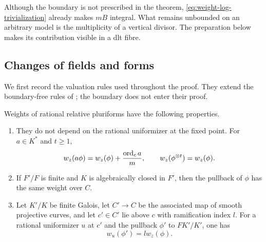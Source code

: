 Although the boundary is not prescribed in the theorem,
\eqref{eq:weight-log-trivialization} already makes $mB$ integral.
What remains unbounded on an arbitrary model is the multiplicity of a
vertical divisor.  The preparation below makes its contribution visible
in a dlt fibre.

\subsection{Changes of fields and forms}

We first record the valuation rules used throughout the proof.  They
extend the boundary-free rules of \cite[Lemma~4.2]{U}; the boundary does
not enter their proof.

\begin{lemma}\label{lem:weight-rules}
Weights of rational relative pluriforms have the following properties.
\begin{enumerate}
\item They do not depend on the rational uniformizer at the fixed point.
For $a\in K^*$ and $t\ge1$,
\[
 w_z(a\phi)=w_z(\phi)+\frac{\operatorname{ord}_c a}{m},
 \qquad w_z(\phi^{\otimes t})=w_z(\phi).
\]
\item If $F'/F$ is finite and $K$ is algebraically closed in $F'$, then
the pullback of $\phi$ has the same weight over $C$.
\item Let $K'/K$ be finite Galois, let $C'\to C$ be the associated map
of smooth projective curves, and let $c'\in C'$ lie above $c$ with
ramification index $l$.  For a rational uniformizer $u$ at $c'$ and the
pullback $\phi'$ to $FK'/K'$, one has
\begin{equation}\label{eq:weight-base-change}
                              w_u(\phi')=l w_z(\phi).
\end{equation}
\end{enumerate}
\end{lemma}

